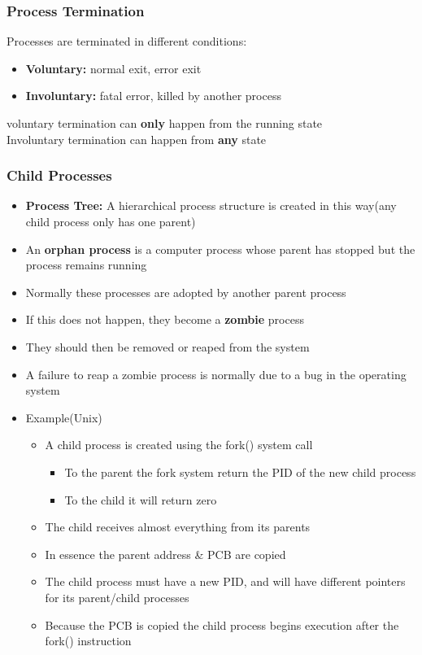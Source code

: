 \documentclass[11pt]{article}
\theoremstyle{definition}
\begin{document}
        \subsubsection{Process Termination}
        Processes are terminated in different conditions:
        \begin{itemize}
            \item \textbf{Voluntary:} normal exit, error exit
            \item \textbf{Involuntary:} fatal error, killed by another process
        \end{itemize}
        voluntary termination can \textbf{only} happen from the running state\\
        Involuntary termination can happen from \textbf{any} state
        \subsubsection{Child Processes}
            \begin{itemize}
                \item \textbf{Process Tree:} A hierarchical process structure is created in this way(any child process only has one parent)
                \item An \textbf{orphan process} is a computer process whose parent has stopped but the process remains running
                \item Normally these processes are adopted by another parent process
                \item If this does not happen, they become a \textbf{zombie} process
                \item They should then be removed or reaped from the system
                \item A failure to reap a zombie process is normally due to a bug in the operating system
                \item Example(Unix)
                    \begin{itemize}
                        \item A child process is created using the fork() system call
                        \begin{itemize}
                            \item To the parent the fork system return the PID of the new child process
                            \item To the child it will return zero
                        \end{itemize}
                        \item The child receives almost everything from its parents
                        \item In essence the parent address \& PCB are copied
                        \item The child process must have a new PID, and will have different pointers for its parent/child processes
                        \item Because the PCB is copied the child process begins execution after the fork() instruction
                    \end{itemize}
            \end{itemize}
\end{document}
